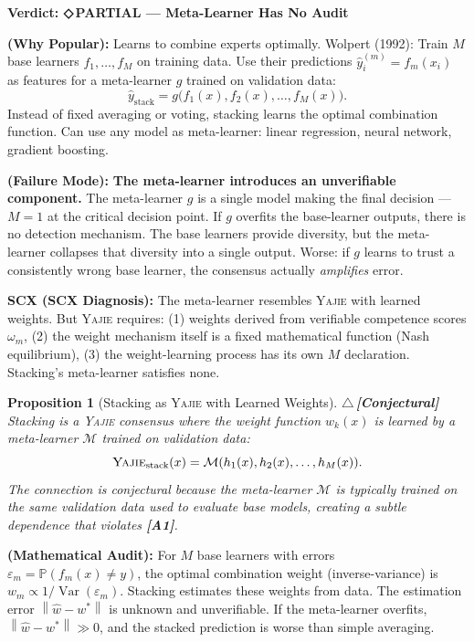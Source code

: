\documentclass[12pt,a4paper]{article}
\newtheorem{proposition}[theorem]{Proposition}
\theoremstyle{definition}
\newcommand{\rigorConjectural}{{\color{red!70!black}$\triangle$\,\textbf{[Conjectural]}}}
\newcommand{\weakness}{{\color{weakcolor}\textbf{◇\,PARTIAL}}}
\newcommand{\Yajie}{\textsc{Yajie}}
\DeclareMathOperator{\Var}{Var}
\newcommand{\Pbb}{\mathbb{P}}
\newcommand{\cM}{\mathcal{M}}
\newcommand{\norm}[1]{\left\lVert#1\right\rVert}
\newcommand{\asmTag}[1]{\textsf{\textbf{[A#1]}}}
\newcommand{\auditHeader}[1]{\medskip\noindent\textbf{\large #1}\medskip}
\newcommand{\whyPopular}{\noindent\textbf{ (Why Popular):} }
\newcommand{\whyFail}{\noindent\textbf{ (Failure Mode):} }
\newcommand{\diagnosis}{\noindent\textbf{SCX (SCX Diagnosis):} }
\newcommand{\mathAudit}{\noindent\textbf{ (Mathematical Audit):} }
\begin{document}
\auditHeader{Verdict: \weakness{} — Meta-Learner Has No Audit}

\whyPopular{} Learns to combine experts optimally. Wolpert (1992): Train $M$ base learners $f_1, \ldots, f_M$ on training data. Use their predictions $\hat{y}_i^{(m)} = f_m(x_i)$ as features for a meta-learner $g$ trained on validation data:
\[
\hat{y}_{\text{stack}} = g\bigl(f_1(x), f_2(x), \ldots, f_M(x)\bigr).
\]
Instead of fixed averaging or voting, stacking learns the optimal combination function. Can use any model as meta-learner: linear regression, neural network, gradient boosting.

\whyFail{} \textbf{The meta-learner introduces an unverifiable component.} The meta-learner $g$ is a single model making the final decision — $M=1$ at the critical decision point. If $g$ overfits the base-learner outputs, there is no detection mechanism. The base learners provide diversity, but the meta-learner collapses that diversity into a single output. Worse: if $g$ learns to trust a consistently wrong base learner, the consensus actually \textit{amplifies} error.

\diagnosis{} The meta-learner resembles \Yajie{} with learned weights. But \Yajie{} requires: (1) weights derived from verifiable competence scores $\omega_m$, (2) the weight mechanism itself is a fixed mathematical function (Nash equilibrium), (3) the weight-learning process has its own $M$ declaration. Stacking's meta-learner satisfies none.

\begin{proposition}[Stacking as \Yajie{} with Learned Weights]\label{prop:stacking_yajie}
\rigorConjectural
Stacking is a \Yajie{} consensus where the weight function $w_k(x)$ is learned by a meta-learner $\cM$ trained on validation data:
\begin{equation}\label{eq:stacking}
    \Yajie_{\text{stack}}(x) = \cM(h_1(x), h_2(x), \ldots, h_M(x)).
\end{equation}
The connection is \emph{conjectural} because the meta-learner $\cM$ is typically trained on the same validation data used to evaluate base models, creating a subtle dependence that violates \asmTag{1}.
\end{proposition}

\mathAudit{} For $M$ base learners with errors $\varepsilon_m = \Pbb(f_m(x) \neq y)$, the optimal combination weight (inverse-variance) is $w_m \propto 1/\Var(\varepsilon_m)$. Stacking estimates these weights from data. The estimation error $\norm{\hat{w} - w^*}$ is unknown and unverifiable. If the meta-learner overfits, $\norm{\hat{w} - w^*} \gg 0$, and the stacked prediction is worse than simple averaging.
\end{document}
